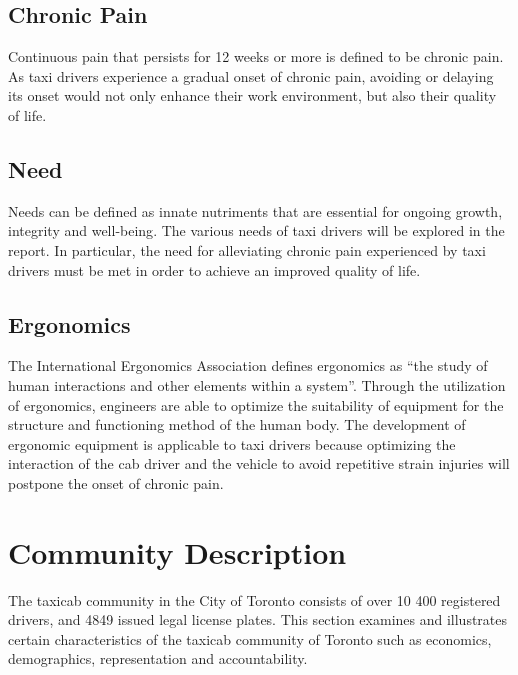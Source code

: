 \documentclass[11pt]{article}
\begin{document}
\subsection{Chronic Pain}
\label{sec:pain}

Continuous pain that persists for 12 weeks or more is defined to be
chronic pain\cite{chronic}. As taxi drivers experience a gradual onset of chronic
pain, avoiding or delaying its onset would not only enhance their work
environment, but also their quality of life.

\subsection{Need}
\label{sec:needs}
Needs can be defined as innate nutriments that are essential for 
ongoing growth, integrity and well-being\cite{deci2000and}. The 
various needs of taxi drivers will be explored in the report. In 
particular, the need for alleviating chronic pain experienced by 
taxi drivers must be met in order to achieve an improved quality 
of life. 

\subsection{Ergonomics}
\label{sec:ergonomics}

The International Ergonomics Association defines ergonomics as “the
study of human interactions and other elements within a system”\cite{ergo}. 
Through the utilization of ergonomics, engineers are able to optimize the suitability
of equipment for the structure and functioning method of the human
body. The development of ergonomic equipment is applicable to
taxi drivers because optimizing the interaction of the cab driver
and the vehicle to avoid repetitive strain injuries will postpone
the onset of chronic pain. 

\section{Community Description}
\label{sec:community}
The taxicab community in the City of Toronto consists of over 10 400 registered drivers, 
and 4849 issued legal license plates. This section examines and 
illustrates certain characteristics of the taxicab community of Toronto such as economics, 
demographics, representation and accountability.
\end{document}
